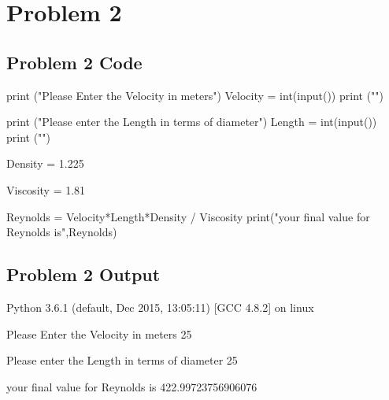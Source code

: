 \documentclass{article}
\begin{document}
\newpage
\section{Problem 2}


\subsection{Problem 2 Code}
print ("Please Enter the Velocity in meters")
Velocity = int(input())
print ("")

print ("Please enter the Length in terms of diameter")
Length = int(input())
print ("")

Density = 1.225

Viscosity = 1.81

Reynolds = Velocity*Length*Density / Viscosity
print("your final value for Reynolds is",Reynolds)


\subsection{Problem 2 Output}

Python 3.6.1 (default, Dec 2015, 13:05:11)
[GCC 4.8.2] on linux
   
Please Enter the Velocity in meters
 25

Please enter the Length in terms of diameter
 25

your final value for Reynolds is 422.99723756906076
   
\end{document}
